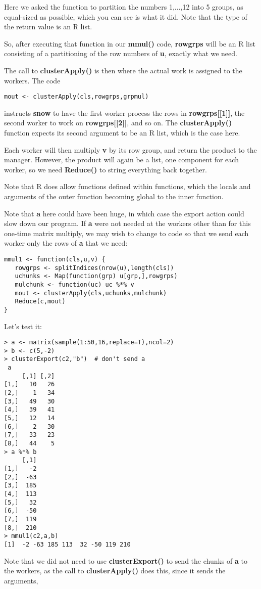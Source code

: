 Here we asked the function to partition the numbers 1,...,12 into 5
groups, as equal-sized as possible, which you can see is what it did.
Note that the type of the return value is an R list.

So, after executing that function in our {\bf mmul()} code, {\bf
rowgrps} will be an R list consisting of a partitioning of the row
numbers of {\bf u}, exactly what we need.

The call to {\bf clusterApply()} is then where the actual work is
assigned to the workers.  The code

\begin{lstlisting}
mout <- clusterApply(cls,rowgrps,grpmul)
\end{lstlisting}

instructs {\bf snow} to have the first worker process the rows in {\bf
rowgrps[[1]]}, the second worker to work on {\bf rowgrps[[2]]},
and so on.  The {\bf clusterApply()} function expects its second
argument to be an R list, which is the case here.

Each worker will then multiply {\bf v} by its row group, and
return the product to the manager.  However, the product will again be a
list, one component for each worker, so we need {\bf Reduce()} to string
everything back together.

Note that R does allow functions defined within functions, which the
locals and arguments of the outer function becoming global to the inner
function.

Note that {\bf a} here could have been huge, in which case the export
action could slow down our program.  If {\bf a} were not needed at the
workers other than for this one-time matrix multiply, we may wish to
change to code so that we send each worker only the rows of {\bf a} that
we need:

\begin{lstlisting}
mmul1 <- function(cls,u,v) {
   rowgrps <- splitIndices(nrow(u),length(cls))
   uchunks <- Map(function(grp) u[grp,],rowgrps)
   mulchunk <- function(uc) uc %*% v
   mout <- clusterApply(cls,uchunks,mulchunk)
   Reduce(c,mout)
}
\end{lstlisting}

Let's test it:

\begin{lstlisting}
> a <- matrix(sample(1:50,16,replace=T),ncol=2)
> b <- c(5,-2)
> clusterExport(c2,"b")  # don't send a
 a
     [,1] [,2]
[1,]   10   26
[2,]    1   34
[3,]   49   30
[4,]   39   41
[5,]   12   14
[6,]    2   30
[7,]   33   23
[8,]   44    5
> a %*% b
     [,1]
[1,]   -2
[2,]  -63
[3,]  185
[4,]  113
[5,]   32
[6,]  -50
[7,]  119
[8,]  210
> mmul1(c2,a,b)
[1]  -2 -63 185 113  32 -50 119 210
\end{lstlisting}

Note that we did not need to use {\bf clusterExport()} to send the
chunks of {\bf a} to the workers, as the call to {\bf clusterApply()}
does this, since it sends the arguments,
